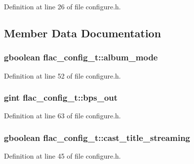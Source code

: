 Definition at line 26 of file configure.\+h.



\subsection{Member Data Documentation}
\subsubsection[{\texorpdfstring{album\+\_\+mode}{album_mode}}]{\setlength{\rightskip}{0pt plus 5cm}gboolean flac\+\_\+config\+\_\+t\+::album\+\_\+mode}\hypertarget{structflac__config__t_a5a4d3eadffdd5ffa124b640de5abba0d}{}\label{structflac__config__t_a5a4d3eadffdd5ffa124b640de5abba0d}


Definition at line 52 of file configure.\+h.

\subsubsection[{\texorpdfstring{bps\+\_\+out}{bps_out}}]{\setlength{\rightskip}{0pt plus 5cm}gint flac\+\_\+config\+\_\+t\+::bps\+\_\+out}\hypertarget{structflac__config__t_a46db567559c134976cfa381752c70040}{}\label{structflac__config__t_a46db567559c134976cfa381752c70040}


Definition at line 63 of file configure.\+h.

\subsubsection[{\texorpdfstring{cast\+\_\+title\+\_\+streaming}{cast_title_streaming}}]{\setlength{\rightskip}{0pt plus 5cm}gboolean flac\+\_\+config\+\_\+t\+::cast\+\_\+title\+\_\+streaming}\hypertarget{structflac__config__t_aec5880990a055cf889f4d107eb7499d0}{}\label{structflac__config__t_aec5880990a055cf889f4d107eb7499d0}


Definition at line 45 of file configure.\+h.

